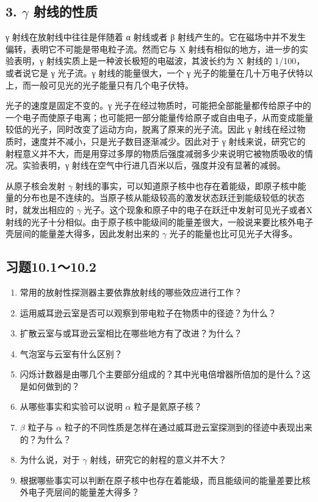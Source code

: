 \subsection{\texorpdfstring{3. \(\gamma\)
射线的性质}{3. \textbackslash gamma 射线的性质}}\label{gamma-ux5c04ux7ebfux7684ux6027ux8d28}

γ 射线在放射线中往往是伴随着 α 射线或者 β
射线产生的。它在磁场中并不发生偏转，表明它不可能是带电粒子流。然而它与 X
射线有相似的地方，进一步的实验表明，γ
射线实质上是一种波长极短的电磁波，其波长约为 X 射线的 1/100，或者说它是
γ 光子流。γ 射线的能量很大，一个 γ
光子的能量在几十万电子伏特以上，而一般可见光的光子能量只有几个电子伏特。

光子的速度是固定不变的。γ
光子在经过物质时，可能把全部能量都传给原子中的一个电子而使原子电离；也可能把一部分能量传给原子或自由电子，从而变成能量较低的光子，同时改变了运动方向，脱离了原来的光子流。因此
γ 射线在经过物质时，速度并不减小，只是光子数目逐渐减少。因此对于 γ
射线来说，研究它的射程意义并不大，而是用穿过多厚的物质后强度减弱多少来说明它被物质吸收的情况。实验表明，γ
射线在空气中行进几百米以后，强度并没有显著的减弱。

从原子核会发射 \(\gamma\)
射线的事实，可以知道原子核中也存在着能级，即原子核中能量的分布也是不连续的。当原子核从能级较高的激发状态跃迁到能级较低的状态时，就发出相应的
\(\gamma\)
光子。这个现象和原子中的电子在跃迁中发射可见光子或者X射线的光子十分相似。由于原子核中能级间的能量差很大，一般说来要比核外电子壳层间的能量差大得多，因此发射出来的
\(\gamma\) 光子的能量也比可见光子大得多。

\subsection{习题10.1～10.2}

\begin{enumerate}
\item
  常用的放射性探测器主要依靠放射线的哪些效应进行工作？
\item
  运用威耳逊云室是否可以观察到带电粒子在物质中的径迹？为什么？
\item
  扩散云室与或耳逊云室相比在哪些地方有了改进？为什么？
\item
  气泡室与云室有什么区别？
\item
  闪烁计数器是由哪几个主要部分组成的？其中光电倍增器所倍加的是什么？这是如何做到的？
\item
  从哪些事实和实验可以说明 \(\alpha\) 粒子是氦原子核？
\item
  \(\beta\) 粒子与 \(\alpha\)
  粒子的不同性质是怎样在通过威耳逊云室探测到的径迹中表现出来的？为什么？
\item
  为什么说，对于 \(\gamma\) 射线，研究它的射程的意义并不大？
\item
  根据哪些事实可以判断在原子核中也存在着能级，而且能级间的能量差要比核外电子壳层间的能量差大得多？
\end{enumerate}

